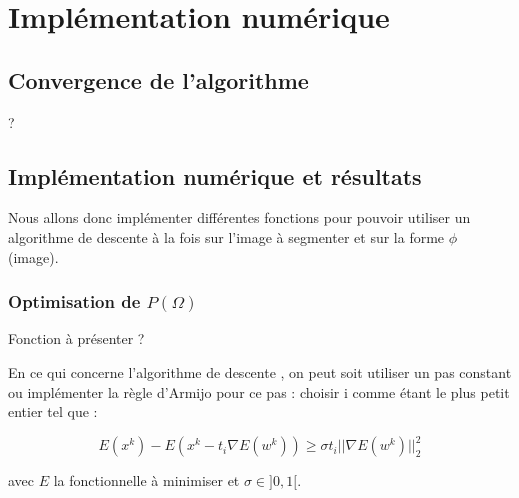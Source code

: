 \section{Implémentation numérique}

\subsection{Convergence de l'algorithme}
?

\subsection{Implémentation numérique et résultats}

Nous allons donc implémenter différentes fonctions pour pouvoir utiliser un algorithme de descente à la fois sur l'image à segmenter et sur la forme $\phi$ (image).

\bigskip

\subsubsection{Optimisation de \texorpdfstring{$P(\Omega)$}{Lg}}

Fonction à présenter ? 

En ce qui concerne l'algorithme de descente , on peut soit utiliser un pas constant  ou implémenter la règle d'Armijo pour ce pas : choisir i comme étant le plus petit entier tel que : 

\[ E(x^k) - E(x^k - t_i \nabla E(w^k)) \geq \sigma t_i || \nabla E(w^k)||_2^2\] 

avec $E$ la fonctionnelle à minimiser et $\sigma \in ]0,1[$. 